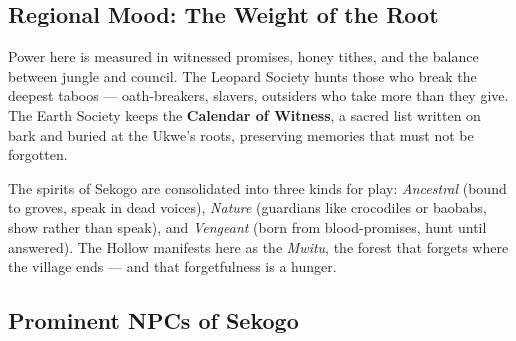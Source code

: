 \subsection*{Regional Mood: The Weight of the Root}

Power here is measured in witnessed promises, honey tithes, and the balance between jungle and council. The Leopard Society hunts those who break the deepest taboos --- oath-breakers, slavers, outsiders who take more than they give. The Earth Society keeps the \textbf{Calendar of Witness}, a sacred list written on bark and buried at the Ukwe's roots, preserving memories that must not be forgotten.

The spirits of Sekogo are consolidated into three kinds for play: \textit{Ancestral} (bound to groves, speak in dead voices), \textit{Nature} (guardians like crocodiles or baobabs, show rather than speak), and \textit{Vengeant} (born from blood-promises, hunt until answered). The Hollow manifests here as the \textit{Mwitu}, the forest that forgets where the village ends --- and that forgetfulness is a hunger.

\subsection*{Prominent NPCs of Sekogo}
\label{sec:sekogo-npcs}


